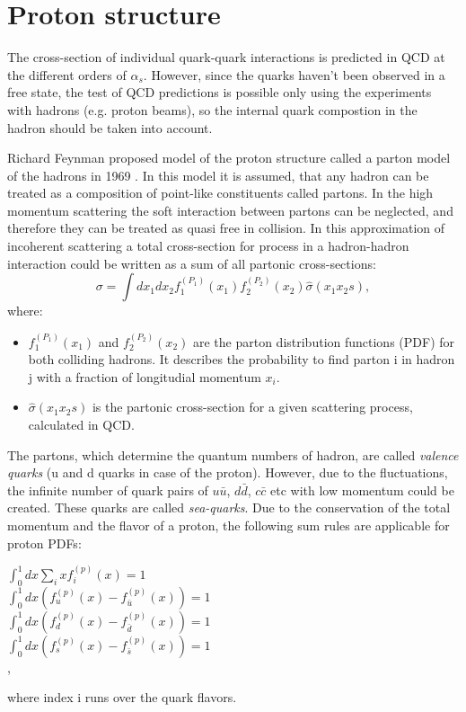 \section{Proton structure}\label{sec:ProtStr}
The cross-section of individual quark-quark interactions is predicted in QCD at the different orders of $\alpha_s$. However, since the quarks haven't been observed in a free state, the test of QCD predictions is possible only using the experiments with hadrons (e.g. proton beams), so the internal quark compostion in the hadron should be taken into account. 

Richard Feynman proposed  model of the proton structure called a parton model of the hadrons in 1969 \cite{Feynman1969}. In this model it is assumed, that any hadron can be treated as a composition of point-like constituents called partons. In the high momentum scattering the soft interaction between partons can be neglected, and therefore they can be treated as quasi free in collision. In this approximation of incoherent scattering a total cross-section for process in a hadron-hadron interaction could be written as a sum of all partonic cross-sections:
\begin{equation}
\sigma = \int dx_1 dx_2 f_1^{(P_1)}(x_1) f_2^{(P_2)}(x_2) \hat{\sigma}(x_1x_2s), 
\end{equation}
where:
\begin{itemize}
\item $f_1^{(P_1)}(x_1)$ and $f_2^{(P_2)}(x_2)$ are the parton distribution functions (PDF) for both colliding hadrons. It describes the probability to find parton i  in hadron j with a fraction of longitudial momentum $x_i$.
\item $\hat{\sigma}(x_1x_2s)$ is the partonic cross-section for a given scattering process, calculated in QCD.
\end{itemize}

The partons, which determine the quantum numbers of hadron, are called \textit{valence quarks} (u and d quarks in case of the proton).  However, due to the fluctuations, the infinite number of quark pairs of $u\bar{u}$, $d\bar{d}$, $c\bar{c}$ etc with low momentum could be created. These quarks are called \textit{sea-quarks}. Due to the conservation of the total momentum and the flavor of a proton, the following sum rules are applicable for proton PDFs:
\begin{center}
$\int_0^1dx \sum_i x f_i^{(p)}(x) = 1$\\
$\int_0^1dx (f_u^{(p)}(x)-f_{\bar{u}}^{(p)}(x)) = 1$\\
$\int_0^1dx (f_d^{(p)}(x)-f_{\bar{d}}^{(p)}(x)) = 1$\\
$\int_0^1dx (f_s^{(p)}(x)-f_{\bar{s}}^{(p)}(x)) = 1$\\,
\end{center}
where index i runs over the quark flavors.

